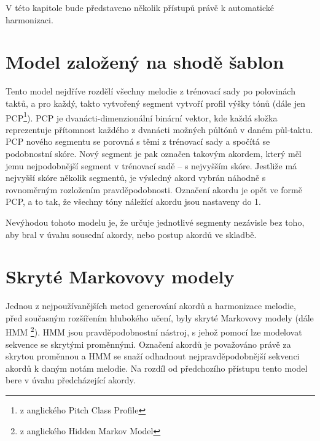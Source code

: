 V této kapitole bude představeno několik přístupů právě k automatické harmonizaci.

\section{Model založený na shodě šablon}
\label{shodaSablon}
Tento model nejdříve rozdělí všechny melodie z trénovací sady po polovinách taktů, 
a pro každý, takto vytvořený segment vytvoří profil výšky tónů 
(dále jen PCP\footnote{z anglického Pitch Class Profile}).
\cite{YinCheng_comparativeStudy}
PCP je dvanácti-dimenzionální binární vektor, 
kde každá složka reprezentuje přítomnost 
každého z dvanácti možných půltónů v daném půl-taktu.
\cite{fujishima}
PCP nového segmentu se porovná s těmi z trénovací sady
a spočítá se podobnostní skóre.
Nový segment je pak označen takovým akordem,
který měl jemu nejpodobnější segment v trénovací sadě -- s nejvyšším skóre.
Jestliže má nejvyšší skóre několik segmentů,
je výsledný akord vybrán náhodně s rovnoměrným rozložením pravděpodobnosti.
Označení akordu je opět ve formě PCP, a to tak,
že všechny tóny náležící akordu jsou nastaveny do 1.
\par

Nevýhodou tohoto modelu je, že určuje jednotlivé segmenty nezávisle bez toho,
aby bral v úvahu sousední akordy, nebo postup akordů ve skladbě.
\cite{YinCheng_comparativeStudy}

\section{Skryté Markovovy modely}
Jednou z nejpoužívanějších metod generování akordů a harmonizace melodie, 
před současným rozšířením hlubokého učení, byly skryté Markovovy modely 
(dále HMM \footnote{z anglického Hidden Markov Model}).
HMM jsou pravděpodobnostní nástroj, 
s jehož pomocí lze modelovat sekvence se skrytými proměnnými.
Označení akordů je považováno právě za skrytou proměnnou a 
HMM se snaží odhadnout nejpravděpodobnější sekvenci akordů
k daným notám melodie.
Na rozdíl od předchozího přístupu 
tento model bere v úvahu předcházející akordy.
\cite{YinCheng_comparativeStudy}

